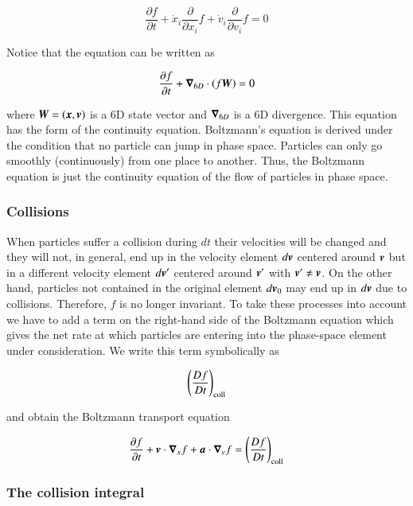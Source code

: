 \begin{equation}
\frac{\partial f}{\partial t} + \dot{x}_i\frac{\partial}{\partial x_i}f + \dot{v}_i\frac{\partial}{\partial v_i} f = 0 
\end{equation}

\noindent Notice that the equation can be written as 

\begin{equation}
\frac{\partial f}{\partial t} + {\boldsymbol{\nabla}}_{6D}\cdot \left( f {\boldsymbol{W}} \right) = 0 
\end{equation}

\noindent where ${\boldsymbol{W}} = ({\boldsymbol{x}},{\boldsymbol{v}})$ is a 6D state vector and ${\boldsymbol{\nabla}}_{6D}$ is a 6D divergence. This equation has the form of the continuity equation. Boltzmann's equation is derived under the condition that no particle can jump in phase space. Particles can only go smoothly (continuously) from one place to another. Thus, the Boltzmann equation is just the continuity equation of the flow of particles in phase space. 


\subsubsection{Collisions}

When particles suffer a collision during $dt$ their velocities will be
changed and they will not, in general, end up in the velocity element
$d{\boldsymbol{v}}$ centered around ${\boldsymbol{v}}$ but in a different velocity element
$d{\boldsymbol{v}}^\prime$ centered around ${\boldsymbol{v}}^\prime$ with ${\boldsymbol{v}}^\prime \neq
{\boldsymbol{v}}$. On the other hand, particles not contained in the original
element $d{\boldsymbol{v}}_0$ may end up in $d{\boldsymbol{v}}$ due to
collisions. Therefore, $f$ is no longer invariant. To take these
processes into account we have to add a term on the right-hand side of
the Boltzmann equation which gives the net rate at which particles are entering into the phase-space element under consideration. We write this term symbolically as

\begin{equation}
\left(\frac{Df}{Dt}\right)_{\rm coll} 
\end{equation}

\noindent and obtain the Boltzmann transport equation

\begin{equation}
\frac{\partial f}{\partial t} + {\boldsymbol{v}}\cdot{\boldsymbol{\nabla}}_x f + {\boldsymbol{a}}\cdot{\boldsymbol{\nabla}}_v f = \left(\frac{Df}{Dt}\right)_{\rm coll} 
\end{equation}

\subsubsection{The collision integral}

